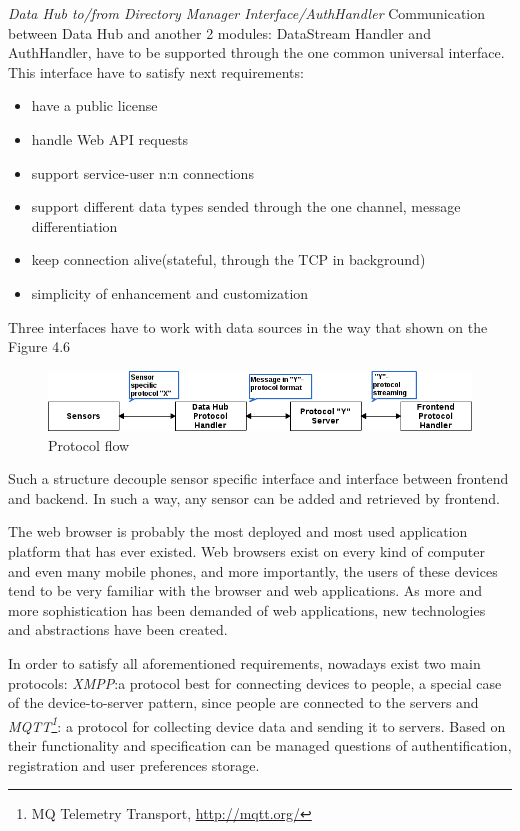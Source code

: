       \emph{Data Hub to/from Directory Manager Interface/AuthHandler}
      \newline
      Communication between Data Hub and another 2 modules: DataStream Handler and AuthHandler, have to be supported through the one common universal interface. This interface have to satisfy next requirements:
      \begin{itemize}
      \item have a public license
      \item handle Web API requests
      \item support service-user n:n connections
      \item support different data types sended through the one channel, message differentiation
      \item keep connection alive(stateful, through the TCP in background)
      \item simplicity of enhancement and customization
      \end{itemize}

      Three interfaces have to work with data sources in the way that shown on the Figure 4.6

      \begin{figure}[!ht]
      \centering
      \includegraphics[scale=0.6]{images/Protocol_flow.png}   
      \caption[Protocol flow]{Protocol flow}
      \label{img:protocol}                           
      \end{figure}
      Such a structure decouple sensor specific interface and interface between frontend and backend. In such a way, any sensor can be added and retrieved by frontend. 
    
      The web browser is probably the most deployed and most used application platform that has ever existed. Web browsers exist on every kind of computer and even many mobile phones, and more importantly, the users of these devices tend to be very familiar with the browser and web applications. As more and more sophistication has been demanded of web applications, new technologies and abstractions have been created.

      In order to satisfy all aforementioned requirements, nowadays exist two main protocols: \emph{XMPP\cite{XMPPbook}}:a protocol best for connecting devices to people, a special case of the device-to-server pattern, since people are connected to the servers and \emph{MQTT\footnote{MQ Telemetry Transport, \url{http://mqtt.org/}}}: a protocol for collecting device data and sending it to servers. Based on their functionality and specification can be managed questions of authentification, registration and user preferences storage.


